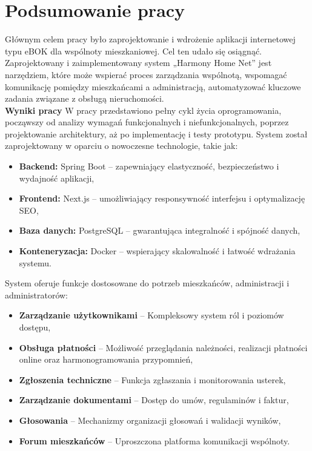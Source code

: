 \chapter{Podsumowanie pracy}

Głównym celem pracy było zaprojektowanie i wdrożenie aplikacji internetowej typu eBOK dla wspólnoty mieszkaniowej. Cel ten udało się osiągnąć. Zaprojektowany i zaimplementowany system „Harmony Home Net” jest narzędziem, które może wspierać proces zarządzania wspólnotą, wspomagać komunikację pomiędzy mieszkańcami a administracją, automatyzować kluczowe zadania związane z obsługą nieruchomości. \\[-10pt]

\noindent\textbf{Wyniki pracy}\newline
\noindent W pracy przedstawiono pełny cykl życia oprogramowania, począwszy od analizy wymagań funkcjonalnych i niefunkcjonalnych, poprzez projektowanie architektury, aż po implementację i testy prototypu. System został zaprojektowany w oparciu o nowoczesne technologie, takie jak:
\begin{itemize}
    \item \textbf{Backend:} Spring Boot -- zapewniający elastyczność, bezpieczeństwo i wydajność aplikacji,
    \item \textbf{Frontend:} Next.js -- umożliwiający responsywność interfejsu i optymalizację SEO,
    \item \textbf{Baza danych:} PostgreSQL -- gwarantująca integralność i spójność danych,
    \item \textbf{Konteneryzacja:} Docker -- wspierający skalowalność i łatwość wdrażania systemu.
\end{itemize}
System oferuje funkcje dostosowane do potrzeb mieszkańców, administracji i administratorów:
\begin{itemize}
    \item \textbf{Zarządzanie użytkownikami} -- Kompleksowy system ról i poziomów dostępu,
    \item \textbf{Obsługa płatności} -- Możliwość przeglądania należności, realizacji płatności online oraz harmonogramowania przypomnień,
    \item \textbf{Zgłoszenia techniczne} -- Funkcja zgłaszania i monitorowania usterek,
    \item \textbf{Zarządzanie dokumentami} -- Dostęp do umów, regulaminów i faktur,
    \item \textbf{Głosowania} -- Mechanizmy organizacji głosowań i walidacji wyników,
    \item \textbf{Forum mieszkańców} -- Uproszczona platforma komunikacji wspólnoty.
\end{itemize}

